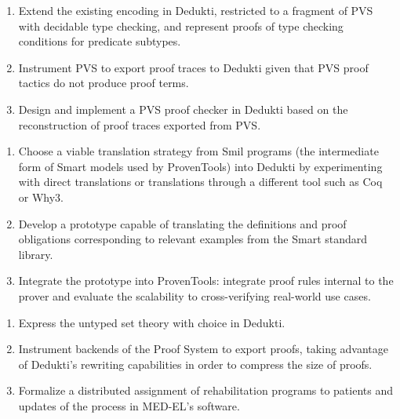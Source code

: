 \begin{workpackage}
\begin{tasklist}
\begin{task}[id=pvs,
  title=Express the theory of PVS in Dedukti,
  shorttitle=Express the theory of PVS in Dedukti,
  lead=Inr,   %
  InrRM=20,  %
  wphases=1-48,
  ]
  \begin{enumerate}
  \item Extend the existing encoding in Dedukti,
    restricted to a fragment of PVS with decidable type checking, and represent
    proofs of type checking conditions for predicate subtypes.
  \item Instrument PVS to export proof traces to Dedukti given that PVS proof
    tactics do not produce proof terms.
  \item Design and implement a PVS proof checker in Dedukti based on the
    reconstruction of proof traces exported from PVS.
  \end{enumerate}
\end{task}

\begin{task}[id=smart,
  title=Express Smart models and proofs in Dedukti,
  shorttitle=Express Smart models and proofs in Dedukti,
  lead=Pro,   %
  ProRM=11,
  wphases=1-48,
  ]
  \begin{enumerate}
  \item Choose a viable translation strategy from Smil programs (the
    intermediate form of Smart models used by ProvenTools) into Dedukti
    by experimenting with direct translations or translations through a
    different tool such as Coq or Why3.
  \item Develop a prototype capable of translating the definitions and proof
    obligations corresponding to relevant examples from the Smart
    standard library.
  \item Integrate the prototype into ProvenTools: integrate proof rules internal
    to the prover and evaluate the scalability to cross-verifying real-world use
    cases.
  \end{enumerate}
\end{task}

\begin{task}[id=tla,
  title=Express the theory of \tlaplus in Dedukti,
  shorttitle=Express the theory of \tlaplus in Dedukti,
  lead=Inr,   %
  InrRM=21,   %
  MedRM=4,
  wphases=1-48,
  ]
  \begin{enumerate}
  \item Express the untyped \tlaplus set theory with choice in
    Dedukti.
  \item Instrument backends of the \tlaplus Proof System to export proofs,
    taking advantage of Dedukti's rewriting capabilities in order to compress
    the size of proofs.
  \item Formalize a distributed assignment of rehabilitation programs to
    patients and updates of the process in MED-EL's software.
  \end{enumerate}
\end{task}


\end{tasklist}
\end{workpackage}
